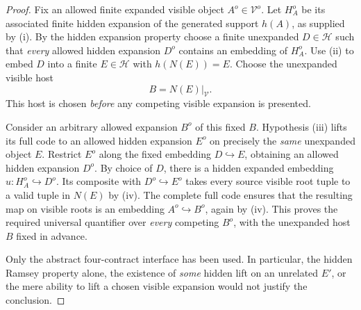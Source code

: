 \begin{proof}
Fix an allowed finite expanded visible object
$A^o\in\mathcal V^o$. Let $H_A^o$ be its
associated finite hidden expansion of the
generated support $h(A)$, as supplied by (i).
By the hidden expansion property choose
a finite unexpanded $D\in\mathcal H$ such that
\emph{every} allowed hidden expansion $D^o$
contains an embedding of $H_A^o$.
Use (ii) to embed $D$ into a finite
$E\in\mathcal H$ with $h(N(E))=E$.
Choose the unexpanded visible host
\[
                              B=N(E)|_{\mathcal V}.
\]
This host is chosen \emph{before} any
competing visible expansion is presented.

Consider an arbitrary allowed expansion $B^o$
of this fixed $B$. Hypothesis (iii) lifts its
full code to an allowed hidden expansion
$E^o$ on precisely the \emph{same} unexpanded
object $E$. Restrict $E^o$ along the fixed
embedding $D\hookrightarrow E$, obtaining
an allowed hidden expansion $D^o$.
By choice of $D$, there is a hidden expanded
embedding $u:H_A^o\hookrightarrow D^o$.
Its composite with $D^o\hookrightarrow E^o$
takes every source visible root tuple to
a valid tuple in $N(E)$ by (iv).
The complete full code ensures that the
resulting map on visible roots is an
embedding $A^o\hookrightarrow B^o$,
again by (iv). This proves the required
universal quantifier over \emph{every}
competing $B^o$, with the unexpanded host
$B$ fixed in advance.

Only the abstract four-contract interface has
been used. In particular, the hidden Ramsey
property alone, the existence of \emph{some}
hidden lift on an unrelated $E'$, or the
mere ability to lift a chosen visible
expansion would not justify the conclusion.
\end{proof}

